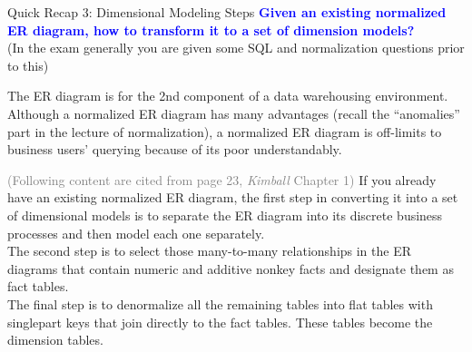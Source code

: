 \begin{frame}[fragile]{Quick Recap 3: Dimensional Modeling Steps}
\textcolor{blue}{\textbf{Given an existing normalized ER diagram, how to transform it to a set of dimension models?}} \\\vspace{3pt}
{\scriptsize (In the exam generally you are given some SQL and normalization questions prior to this)}\\\vspace{3pt}
\begin{small}
The ER diagram is for the 2nd component of a data warehousing environment. 
Although a normalized ER diagram has many advantages (recall the ``anomalies'' part in the lecture of normalization), a normalized ER diagram is off-limits to business users' querying because of its poor understandably.\\\vspace{3pt}

\textcolor{gray}{(Following content are cited from page 23, \textit{Kimball} Chapter 1)}
If you already have an existing normalized ER diagram, the first step in converting it into a set of dimensional models is to separate the ER diagram into its discrete business processes and then model each one separately. \\\vspace{3pt}
The second step is to select those many-to-many relationships in the ER diagrams that contain numeric and additive nonkey facts and designate them as fact tables. \\\vspace{3pt}
The final step is to denormalize all the remaining tables into flat tables with singlepart keys that join directly to the fact tables. These tables become the dimension tables.
\end{small}
\end{frame}

